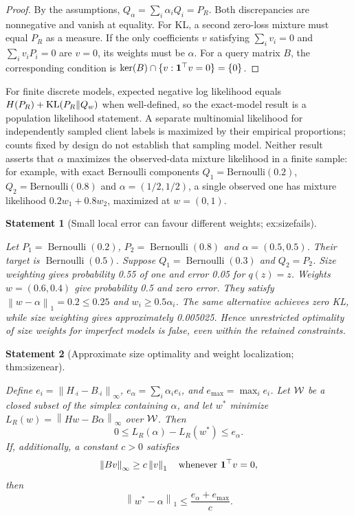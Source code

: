 \documentclass[11pt]{article}
\newtheorem{statement}{Statement}
\newcommand{\norm}[1]{\left\lVert#1\right\rVert}\newcommand{\qh}{\widehat H}
\begin{document}
\begin{proof}
By the assumptions, $Q_\alpha=\sum_i\alpha_iQ_i=P_R$. Both discrepancies are nonnegative and vanish at equality. For KL, a second zero-loss mixture must equal $P_R$ as a measure. If the only coefficients $v$ satisfying $\sum_i v_i=0$ and $\sum_i v_iP_i=0$ are $v=0$, its weights must be $\alpha$. For a query matrix $B$, the corresponding condition is $\ker(B)\cap\{v:\mathbf 1^\top v=0\}=\{0\}$.
\end{proof}

For finite discrete models, expected negative log likelihood equals $H(P_R)+\operatorname{KL}(P_R\|Q_w)$ when well-defined, so the exact-model result is a population likelihood statement. A separate multinomial likelihood for independently sampled client labels is maximized by their empirical proportions; counts fixed by design do not establish that sampling model. Neither result asserts that $\alpha$ maximizes the observed-data mixture likelihood in a finite sample: for example, with exact Bernoulli components $Q_1=\mathrm{Bernoulli}(0.2)$, $Q_2=\mathrm{Bernoulli}(0.8)$ and $\alpha=(1/2,1/2)$, a single observed one has mixture likelihood $0.2w_1+0.8w_2$, maximized at $w=(0,1)$.

\begin{statement}[Small local error can favour different weights; ex:sizefails]\label{ex:sizefails}

Let $P_1=\operatorname{Bernoulli}(0.2)$, $P_2=\operatorname{Bernoulli}(0.8)$ and $\alpha=(0.5,0.5)$. Their target is $\operatorname{Bernoulli}(0.5)$. Suppose $Q_1=\operatorname{Bernoulli}(0.3)$ and $Q_2=P_2$. Size weighting gives probability 0.55 of one and error 0.05 for $q(z)=z$. Weights $w=(0.6,0.4)$ give probability 0.5 and zero error. They satisfy $\norm{w-\alpha}_1=0.2\le0.25$ and $w_i\ge0.5\alpha_i$. The same alternative achieves zero KL, while size weighting gives approximately 0.005025. Hence unrestricted optimality of size weights for imperfect models is false, even within the retained constraints.

\end{statement}


\begin{statement}[Approximate size optimality and weight localization; thm:sizenear]\label{thm:sizenear}

Define $e_i=\norm{H_{\cdot i}-B_{\cdot i}}_\infty$, $e_\alpha=\sum_i\alpha_i e_i$, and $e_{\max}=\max_i e_i$. Let $\mathcal W$ be a closed subset of the simplex containing $\alpha$, and let $w^*$ minimize $L_R(w)=\norm{Hw-B\alpha}_\infty$ over $\mathcal W$. Then
\begin{equation}
0\le L_R(\alpha)-L_R(w^*)\le e_\alpha.
\end{equation}
If, additionally, a constant $c>0$ satisfies
\begin{equation}
\norm{Bv}_\infty\ge c\norm v_1\quad\text{whenever }\ind^\top v=0,
\end{equation}
then
\begin{equation}
\norm{w^*-\alpha}_1\le\frac{e_\alpha+e_{\max}}{c}.
\end{equation}

\end{statement}
\end{document}
